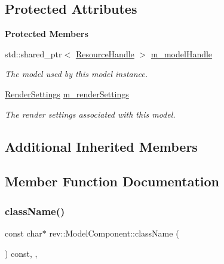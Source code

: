 \subsection*{Protected Attributes}
\begin{Indent}\textbf{ Protected Members}\par
\begin{DoxyCompactItemize}
\item 
\mbox{\label{classrev_1_1_model_component_a8f9a368f5a42776ed19a44f421ce9e3c}} 
std\+::shared\+\_\+ptr$<$ \mbox{\hyperlink{classrev_1_1_resource_handle}{Resource\+Handle}} $>$ \mbox{\hyperlink{classrev_1_1_model_component_a8f9a368f5a42776ed19a44f421ce9e3c}{m\+\_\+model\+Handle}}
\begin{DoxyCompactList}\small\item\em The model used by this model instance. \end{DoxyCompactList}\item 
\mbox{\label{classrev_1_1_model_component_a39295ac3c615b985003b7243d324e814}} 
\mbox{\hyperlink{classrev_1_1_render_settings}{Render\+Settings}} \mbox{\hyperlink{classrev_1_1_model_component_a39295ac3c615b985003b7243d324e814}{m\+\_\+render\+Settings}}
\begin{DoxyCompactList}\small\item\em The render settings associated with this model. \end{DoxyCompactList}\end{DoxyCompactItemize}
\end{Indent}
\subsection*{Additional Inherited Members}


\subsection{Member Function Documentation}
\mbox{\label{classrev_1_1_model_component_a31298d9d0fb5d7e43cbe6de3050d4f6a}} 
\subsubsection{\texorpdfstring{className()}{className()}}
{\footnotesize\ttfamily const char$\ast$ rev\+::\+Model\+Component\+::class\+Name (\begin{DoxyParamCaption}{ }\end{DoxyParamCaption}) const\hspace{0.3cm}{\ttfamily [inline]}, {\ttfamily [override]}, {\ttfamily [virtual]}}



